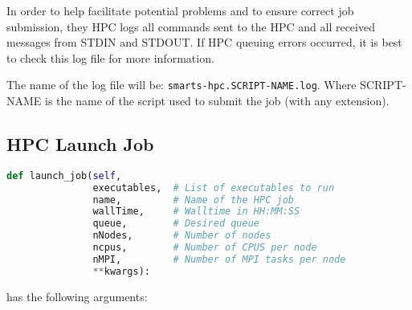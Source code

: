 In order to help facilitate potential problems and to ensure correct job
submission, they HPC logs all commands sent to the HPC and all received
messages from STDIN and STDOUT. If HPC queuing errors occurred, it is best to
check this log file for more information.

The name of the log file will be: {\tt smarts-hpc.SCRIPT-NAME.log}. Where
SCRIPT-NAME is the name of the script used to submit the job (with any
extension).

\subsection{HPC Launch Job}
\label{sec:launchjob}

\begin{lstlisting}[language=Python, 
                   caption={HPC.launch\_job},
                   label={lst:hpc.launch_job},
                   float]
def launch_job(self,
               executables,  # List of executables to run
               name,         # Name of the HPC job
               wallTime,     # Walltime in HH:MM:SS
               queue,        # Desired queue
               nNodes,       # Number of nodes
               ncpus,        # Number of CPUS per node
               nMPI,         # Number of MPI tasks per node
               **kwargs):
\end{lstlisting}

\launchjob has the following arguments:

